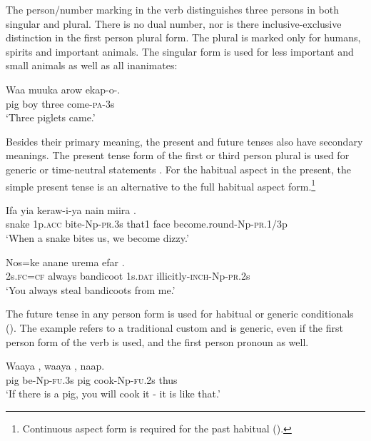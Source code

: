 The person/number marking in the verb distinguishes three persons in both singular and plural. There is no dual number, nor is there inclusive-exclusive distinction in the first person plural form. The plural is marked only for humans, spirits and important animals. The singular form is used for less important and small animals as well as all inanimates:

\ea%
\label{ex:3:x236}
\gll Waa muuka arow ekap-o-. \\
pig boy three come-\textsc{pa}-3s \\
\glt`Three piglets came.'
\z

Besides their primary meaning, the present and future tenses also have secondary meanings. The present tense form of the first or third person plural is used for generic or time-neutral statements . For the habitual aspect in the present, the simple present tense  is an alternative to the full habitual aspect form.\footnote{Continuous aspect form is required for the past habitual ().} 

\ea%
\label{ex:3:x1034}
\gll Ifa yia keraw-i-ya nain miira . \\
snake 1p.\textsc{acc} bite-Np-\textsc{pr}.3s that1 face become.round-Np-\textsc{pr}.1/3p\\
\glt `When a snake bites us, we become dizzy.'
\z

\ea%
\label{ex:3:x1035}
\gll Nos=ke anane urema efar . \\
2s.\textsc{fc}=\textsc{cf} always bandicoot 1s.\textsc{dat} illicitly-\textsc{inch}-Np-\textsc{pr}.2s\\
\glt`You always steal bandicoots from me.'
\z

The future tense in any person form is used for habitual or generic conditionals (). The example  refers to a traditional custom and is generic, even if the first person form of the verb is used, and the first person pronoun as well.

\ea%
\label{ex:3:x1640}
\gll Waaya , waaya , naap. \\
pig be-Np-\textsc{fu}.3s pig cook-Np-\textsc{fu}.2s thus\\
\glt`If there is a pig, you will cook it - it is like that.'
\z

